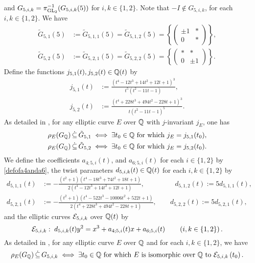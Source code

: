 and $G_{5,i,k} = \pi_{\operatorname{GL}_2}^{-1}(G_{5,i,k}(5))$ for $i,k \in \{1,2 \}$. Note that $-I \notin G_{5,i,k}$, for each $i,k \in \{1, 2 \}$. We have 
\[
\begin{split}
\tilde{G}_{5,1}(5) &:= \tilde{G}_{5,1,1}(5) = \tilde{G}_{5,1,2}(5) = \left\{ \begin{pmatrix} \pm 1 & * \\ 0 & * \end{pmatrix} \right\}, \\
\tilde{G}_{5,2}(5) &:= \tilde{G}_{5,2,1}(5) = \tilde{G}_{5,2,2}(5) = \left\{ \begin{pmatrix} * & * \\ 0 & \pm 1 \end{pmatrix} \right\}.
\end{split}
\]
Define the functions $j_{5,1}(t), j_{5,2}(t) \in \mathbb{Q}(t)$ by
\[
\begin{split}
j_{5,1}(t) &:= \frac{(t^4 - 12t^3 + 14t^2 + 12t + 1)^3}{t^5(t^2 - 11t - 1)}, \\
j_{5,2}(t) &:= \frac{(t^4 + 228t^3 + 494t^2 - 228t + 1)^3}{t(t^2 - 11t - 1)^5}.
\end{split}
\]
As detailed in \cite{zywina}, for any elliptic curve $E$ over $\mathbb{Q}$ with $j$-invariant $j_E$, one has
\begin{equation*} \label{level5jinvariantstatement}
\begin{split}
\rho_{E}(G_{\mathbb{Q}}) \, \dot\subseteq \, \tilde{G}_{5,1} \; &\Longleftrightarrow \; \exists t_0 \in \mathbb{Q} \text{ for which } j_E = j_{5,1}(t_0), \\
\rho_{E}(G_{\mathbb{Q}}) \, \dot\subseteq \, \tilde{G}_{5,2} \; &\Longleftrightarrow \; \exists t_0 \in \mathbb{Q} \text{ for which } j_E = j_{5,2}(t_0).
\end{split}
\end{equation*}
We define the coefficients $a_{4;5,i}(t)$, and $a_{6;5,i}(t)$ for each $i \in \{1, 2\}$ by \eqref{defofa4anda6}, the twist parameters $d_{5,i,k}(t) \in \mathbb{Q}(t)$ for each $i,k \in \{1, 2\}$ by
\[
\begin{split}
d_{5,1,1}(t) &:= - \frac{(t^2+1)(t^4 - 18t^3 + 74t^2 + 18t + 1)}{2(t^4 - 12t^3 + 14t^2 + 12t + 1)}, \quad\quad\quad\quad\;\, d_{5,1,2}(t) := 5 d_{5,1,1}(t), \\
d_{5,2,1}(t) &:= - \frac{(t^2+1)(t^4 - 522t^3 - 10006t^2 + 522t + 1)}{2(t^4 + 228t^3 + 494t^2 - 228t + 1)}, \quad\quad d_{5,2,2}(t) := 5 d_{5,2,1}(t),
\end{split}
\]
and the elliptic curves $\mathcal{E}_{5,i,k}$ over $\mathbb{Q}(t)$ by
\[
\mathcal{E}_{5,i,k} : \; d_{5,i,k}(t) y^2 = x^3 + a_{4;5,i}(t) x + a_{6;5,i}(t) \quad\quad \left( i,k \in \{1, 2 \} \right).
\]
As detailed in \cite{zywina}, for any elliptic curve $E$ over $\mathbb{Q}$ and for each $i,k \in \{1, 2\}$, we have
\[
\rho_{E}(G_{\mathbb{Q}}) \, \dot\subseteq \, G_{5,i,k} \; \Longleftrightarrow \; \exists t_0 \in \mathbb{Q} \text{ for which } E \text{ is isomorphic over $\mathbb{Q}$ to } \mathcal{E}_{5,i,k}\left( t_0 \right). \\
\]

